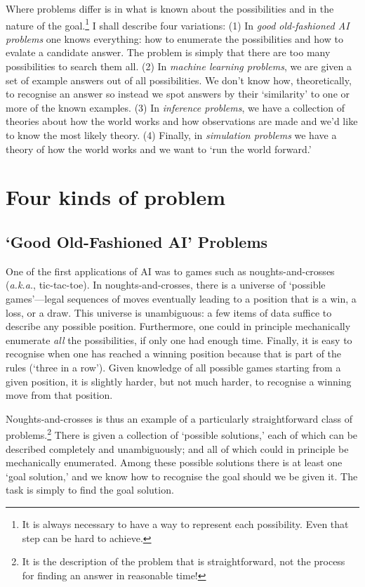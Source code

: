 \documentclass[10pt, a4, twocolumn]{article}
\begin{document}
Where problems differ is in what is known about the possibilities and in the
nature of the goal.\footnote{It is always necessary to have a way to represent
each possibility. Even that step can be hard to achieve.} I shall describe four
variations: (1) In \emph{good old-fashioned AI problems} one knows everything:
how to enumerate the possibilities and how to evalate a candidate answer. The
problem is simply that there are too many possibilities to search them all. (2)
In \emph{machine learning problems}, we are given a set of example answers out
of all possibilities. We don't know how, theoretically, to recognise an answer
so instead we spot answers by their `similarity' to one or more of the known
examples. (3) In \emph{inference problems}, we have a collection of theories
about how the world works and how observations are made and we'd like to know
the most likely theory. (4) Finally, in \emph{simulation problems} we have a
theory of how the world works and we want to `run the world forward.'

\section{Four kinds of problem}

\subsection{`Good Old-Fashioned AI' Problems}

One of the first applications of AI was to games such as noughts-and-crosses
(\emph{a.k.a.}, tic-tac-toe). In noughts-and-crosses, there is a universe of
`possible games'---legal sequences of moves eventually leading to a position that
is a win, a loss, or a draw. This universe is unambiguous: a few items of data
suffice to describe any possible position. Furthermore, one could in principle
mechanically enumerate \emph{all} the possibilities, if only one had enough
time. Finally, it is easy to recognise when one has reached a winning position
because that is part of the rules (`three in a row'). Given knowledge of all
possible games starting from a given position, it is slightly harder, but not
much harder, to recognise a winning move from that position.

Noughts-and-crosses is thus an example of a particularly straightforward class
of problems.\footnote{It is the description of the problem that is
straightforward, not the process for finding an answer in reasonable time!}
There is given a collection of `possible solutions,' each of which can be
described completely and unambiguously; and all of which could in principle be
mechanically enumerated. Among these possible solutions there is at least one
`goal solution,' and we know how to recognise the goal should we be given
it. The task is simply to find the goal solution.
\end{document}
